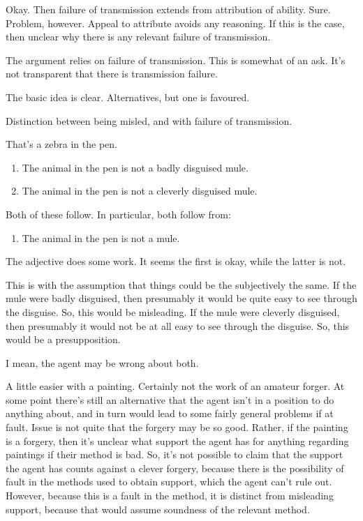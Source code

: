 \documentclass[10pt]{article}
\begin{document}
Okay.
Then failure of transmission extends from attribution of ability.
Sure.
Problem, however.
Appeal to attribute avoids any reasoning.
If this is the case, then unclear why there is any relevant failure of transmission.


\begin{note}
  The argument relies on failure of transmission.
  This is somewhat of an ask.
  It's not transparent that there is transmission failure.

  The basic idea is clear.
  Alternatives, but one is favoured.

  Distinction between being misled, and with failure of transmission.

  That's a zebra in the pen.
  \begin{enumerate}
  \item The animal in the pen is not a badly disguised mule.
  \item The animal in the pen is not a cleverly disguised mule.
  \end{enumerate}
  Both of these follow.
  In particular, both follow from:
  \begin{enumerate}
  \item The animal in the pen is not a mule.
  \end{enumerate}
  The adjective does some work.
  It seems the first is okay, while the latter is not.

  This is with the assumption that things could be the subjectively the same.
  If the mule were badly disguised, then presumably it would be quite easy to see through the disguise.
  So, this would be misleading.
  If the mule were cleverly disguised, then presumably it would not be at all easy to see through the disguise.
  So, this would be a presupposition.

  I mean, the agent may be wrong about both.

  A little easier with a painting.
  Certainly not the work of an amateur forger.
  At some point there's still an alternative that the agent isn't in a position to do anything about, and in turn would lead to some fairly general problems if at fault.
  Issue is not quite that the forgery may be so good.
  Rather, if the painting is a forgery, then it's unclear what support the agent has for anything regarding paintings if their method is bad.
  So, it's not possible to claim that the support the agent has counts against a clever forgery, because there is the possibility of fault in the methods used to obtain support, which the agent can't rule out.
  However, because this is a fault in the method, it is distinct from misleading support, because that would assume soundness of the relevant method.
\end{note}
\end{document}
